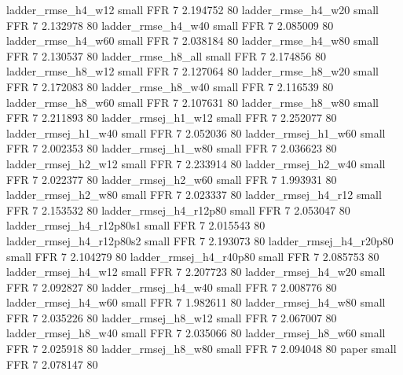       ladder_rmse_h4_w12      small      FFR                 7 2.194752 80
      ladder_rmse_h4_w20      small      FFR                 7 2.132978 80
      ladder_rmse_h4_w40      small      FFR                 7 2.085009 80
      ladder_rmse_h4_w60      small      FFR                 7 2.038184 80
      ladder_rmse_h4_w80      small      FFR                 7 2.130537 80
      ladder_rmse_h8_all      small      FFR                 7 2.174856 80
      ladder_rmse_h8_w12      small      FFR                 7 2.127064 80
      ladder_rmse_h8_w20      small      FFR                 7 2.172083 80
      ladder_rmse_h8_w40      small      FFR                 7 2.116539 80
      ladder_rmse_h8_w60      small      FFR                 7 2.107631 80
      ladder_rmse_h8_w80      small      FFR                 7 2.211893 80
     ladder_rmsej_h1_w12      small      FFR                 7 2.252077 80
     ladder_rmsej_h1_w40      small      FFR                 7 2.052036 80
     ladder_rmsej_h1_w60      small      FFR                 7 2.002353 80
     ladder_rmsej_h1_w80      small      FFR                 7 2.036623 80
     ladder_rmsej_h2_w12      small      FFR                 7 2.233914 80
     ladder_rmsej_h2_w40      small      FFR                 7 2.022377 80
     ladder_rmsej_h2_w60      small      FFR                 7 1.993931 80
     ladder_rmsej_h2_w80      small      FFR                 7 2.023337 80
     ladder_rmsej_h4_r12      small      FFR                 7 2.153532 80
  ladder_rmsej_h4_r12p80      small      FFR                 7 2.053047 80
ladder_rmsej_h4_r12p80s1      small      FFR                 7 2.015543 80
ladder_rmsej_h4_r12p80s2      small      FFR                 7 2.193073 80
  ladder_rmsej_h4_r20p80      small      FFR                 7 2.104279 80
  ladder_rmsej_h4_r40p80      small      FFR                 7 2.085753 80
     ladder_rmsej_h4_w12      small      FFR                 7 2.207723 80
     ladder_rmsej_h4_w20      small      FFR                 7 2.092827 80
     ladder_rmsej_h4_w40      small      FFR                 7 2.008776 80
     ladder_rmsej_h4_w60      small      FFR                 7 1.982611 80
     ladder_rmsej_h4_w80      small      FFR                 7 2.035226 80
     ladder_rmsej_h8_w12      small      FFR                 7 2.067007 80
     ladder_rmsej_h8_w40      small      FFR                 7 2.035066 80
     ladder_rmsej_h8_w60      small      FFR                 7 2.025918 80
     ladder_rmsej_h8_w80      small      FFR                 7 2.094048 80
                   paper      small      FFR                 7 2.078147 80
